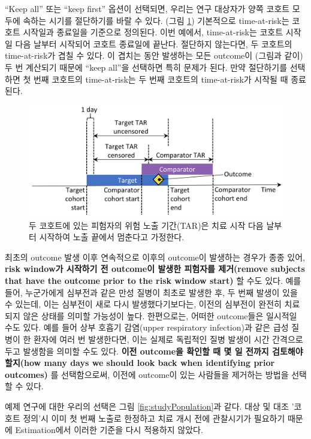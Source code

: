 \documentclass[11pt]{book}
\theoremstyle{definition}
\theoremstyle{definition}
\theoremstyle{definition}
\theoremstyle{remark}
\begin{document}
``Keep all'' 또는 ``keep first'' 옵션이 선택되면, 우리는 연구 대상자가
양쪽 코호트 모두에 속하는 시기를 절단하기를 바랄 수 있다. (그림
\ref{fig:tar}) 기본적으로 time-at-risk는 코호트 시작일과 종료일을
기준으로 정의된다. 이번 예에서, time-at-risk는 코호트 시작일 다음 날부터
시작되어 코호트 종료일에 끝난다. 절단하지 않는다면, 두 코호트의
time-at-risk가 겹칠 수 있다. 이 겹치는 동안 발생하는 모든 outcome이
(그림과 같이) 두 번 계산되기 때문에 ``keep all''을 선택하면 특히 문제가
된다. 만약 절단하기를 선택하면 첫 번째 코호트의 time-at-risk는 두 번째
코호트의 time-at-risk가 시작될 때 종료된다.

\begin{figure}

{\centering \includegraphics[width=0.9\linewidth]{images/PopulationLevelEstimation/tar} 

}

\caption{두 코호트에 있는 피험자의 위험 노출 기간(TAR)은 치료 시작 다음 날부터 시작하여 노출 끝에서 멈춘다고 가정한다.}\label{fig:tar}
\end{figure}

최초의 outcome 발생 이후 연속적으로 이후의 outcome이 발생하는 경우가
종종 있어, \textbf{risk window가 시작하기 전 outcome이 발생한 피험자를
제거(remove subjects that have the outcome prior to the risk window
start)} 할 수도 있다. 예를 들어, 누군가에게 심부전과 같은 만성 질병이
최초로 발생한 후, 두 번째 발생이 있을 수 있는데, 이는 심부전이 새로 다시
발생했다기보다는, 이전의 심부전이 완전히 치료되지 않은 상태를 의미할
가능성이 높다. 한편으로는, 어떠한 outcome들은 일시적일 수도 있다. 예를
들어 상부 호흡기 감염(upper respiratory infection)과 같은 급성 질병이 한
환자에 여러 번 발생한다면, 이는 실제로 독립적인 질병 발생이 시간
간격으로 두고 발생함을 의미할 수도 있다. \textbf{이전 outcome을 확인할
때 몇 일 전까지 검토해야 할지(how many days we should look back when
identifying prior outcomes)} 를 선택함으로써, 이전에 outcome이 있는
사람들을 제거하는 방법을 선택할 수 있다.

예제 연구에 대한 우리의 선택은 그림 \ref{fig:studyPopulation}과 같다.
대상 및 대조 '코호트 정의'시 이미 첫 번째 노출로 한정하고 치료 개시 전에
관찰시기가 필요하기 때문에 Estimation에서 이러한 기준을 다시 적용하지
않았다.
\end{document}
